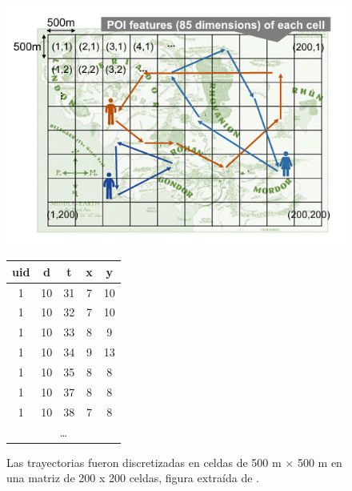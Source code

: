 \begin{figure}[!htb]
\centering
\begin{minipage}{0.5\textwidth}
    \centering
    \includegraphics[width=\textwidth]{Graphics/humob_matrix_mobility.jpg}
    \caption{Las trayectorias fueron discretizadas en celdas de 500 m × 500 m en una matriz de 200 x 200 celdas, figura extraída de \cite{yabe2024yjmob100k}.}
    \label{fig:humob_matrix_mobility}
\end{minipage}%
\hfill
\begin{minipage}{0.45\textwidth}
    \centering
    \begin{tabular}{|c|c|c|c|c|}
    \hline
    \textbf{uid} & \textbf{d} & \textbf{t} & \textbf{x} & \textbf{y} \\ \hline
    1 & 10 & 31 & 7 & 10 \\ \hline
    1 & 10 & 32 & 7 & 10 \\ \hline
    1 & 10 & 33 & 8 & 9  \\ \hline
    1 & 10 & 34 & 9 & 13 \\ \hline
    1 & 10 & 35 & 8 & 8  \\ \hline
    1 & 10 & 37 & 8 & 8  \\ \hline
    1 & 10 & 38 & 7 & 8  \\ \hline
    \multicolumn{5}{|c|}{\dots} \\ \hline
    \end{tabular}
    \label{tab:humob_example_data}
\end{minipage}
\end{figure}


